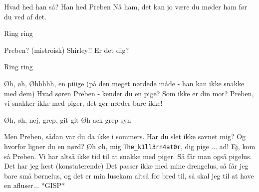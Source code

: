 \documentclass[a4paper,11pt]{article}
\begin{document}
\begin{sketch}
   Hvad hed han så?
   Han hed Preben
   Nå ham, det kan jo være du møder ham før du ved af det.


   Ring ring


   Preben? (mistroisk)
   Shirley!! Er det dig?


   Ring ring


   Øh, øh, Øhhhhh, en piiige (på den meget nørdede måde - han kan ikke snakke med dem)
   Hvad søren Preben - kender du en pige?
   Som ikke er din mor?
   Preben, vi snakker ikke med piger, det gør nørder bare ikke!

   Øh, øh, nej, grep, git git
   Øh ack grep syn

   Men Preben, sådan var du da ikke i sommers. Har du slet ikke savnet mig?
   Og hvorfor ligner du en nørd?
   Øh øh, mig \verb!The_k1ll3rn4at0r!, dig pige ... ad!
   Ej, kom så Preben. Vi har altså ikke tid til at snakke med piger.
   Så får man også pigelus. Det har jeg læst (konstaterende)
   Det passer ikke med mine drengelus, så får jeg bare små børnelus, og det er min lusekam altså for bred til, så skal jeg til at have en afluser...
   *GISP*
\end{sketch}
\end{document}
